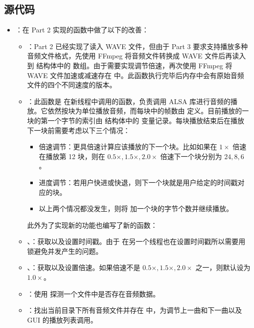 \subsection{源代码}

\begin{itemize}
    \item {}：在 Part 2 实现的函数中做了以下的改善：
    \begin{itemize}
        \item {}：Part 2 已经实现了读入 WAVE 文件，但由于 Part 3 要求支持播放多种音频文件格式，先使用 FFmpeg 将音频文件转换成 WAVE 文件后再读入到  结构体中的  数组。由于需要实现调节倍速，再次使用 FFmpeg 将 WAVE 文件加速或减速存在  中。此函数执行完毕后内存中会有原始音频文件的四个不同速度的版本。
        \item {}：此函数是  在新线程中调用的函数，负责调用 ALSA 库进行音频的播放。它依然按块为单位播放音频，而每块中的帧数由  定义。目前播放的一块的第一个字节的索引由  结构体中的  变量记录。每块播放结束后在播放下一块前需要考虑以下三个情况：
        \begin{itemize}
            \item 倍速调节：更具倍速计算应该播放的下一个块。比如如果在 $1\times$ 倍速在播放第 12 块，则在 $0.5\times,1.5\times,2.0\times$ 倍速下一个块分别为 $24, 8, 6$。
            \item 进度调节：若用户快进或快退，则下一个块就是用户给定的时间戳对应的块。
            \item 以上两个情况都没发生，则将  加一个块的字节个数并继续播放。
        \end{itemize}
        此外为了实现新的功能也编写了新的函数：
        \item {}、：获取以及设置时间戳。由于  在另一个线程也在设置时间戳所以需要用锁避免并发产生的问题。
        \item {}、：获取以及设置倍速。如果倍速不是 $0.5\times,1.5\times,2.0\times$ 之一，则默认设为 $1.0\times$。
        \item {}：使用  探测一个文件中是否存在音频数据。
        \item {}：找出当前目录下所有音频文件并存在  中，为调节上一曲和下一曲以及 GUI 的播放列表调用。
    \end{itemize}

\end{itemize}
